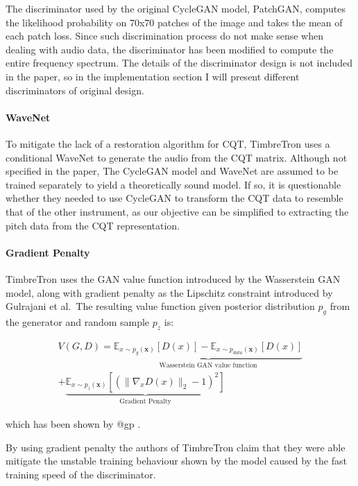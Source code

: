 \documentclass[]{article}
\begin{document}
The discriminator used by the original CycleGAN model, PatchGAN,
computes the likelihood probability on 70x70 patches of the image and
takes the mean of each patch loss. Since such discrimination process do
not make sense when dealing with audio data, the discriminator has been
modified to compute the entire frequency spectrum. The details of the
discriminator design is not included in the paper, so in the
implementation section I will present different discriminators of
original design.

\paragraph{WaveNet}

To mitigate the lack of a restoration algorithm for CQT, TimbreTron uses
a conditional WaveNet to generate the audio from the CQT matrix.
Although not specified in the paper, The CycleGAN model and WaveNet are
assumed to be trained separately to yield a theoretically sound model.
If so, it is questionable whether they needed to use CycleGAN to
transform the CQT data to resemble that of the other instrument, as our
objective can be simplified to extracting the pitch data from the CQT
representation.

\paragraph{Gradient Penalty}

TimbreTron uses the GAN value function introduced by the Wasserstein GAN
model, along with gradient penalty as the Lipschitz constraint
introduced by Gulrajani et al.~The resulting value function given
posterior distribution \(p_g\) from the generator and random sample
\(p_z\) is:

\begin{multline}
    V(G, D) = \underbrace{
        \mathbb{E}_{x \sim p_{g}(\mathbf{x})} [D(x)] - \mathbb{E}_{x \sim p_{data}(\mathbf{x})} [D(x)]
        }_\textrm{Wasserstein GAN value function} \\ +
        \underbrace{
            \mathbb{E}_{x \sim p_z(\mathbf{x})} [(\| \nabla_x D(x) \|_2 - 1)^2]
        }_\textrm{Gradient Penalty} 
\end{multline}

which has been shown by @gp .

By using gradient penalty the authors of TimbreTron claim that they were
able mitigate the unstable training behaviour shown by the model caused
by the fast training speed of the discriminator.
\end{document}
